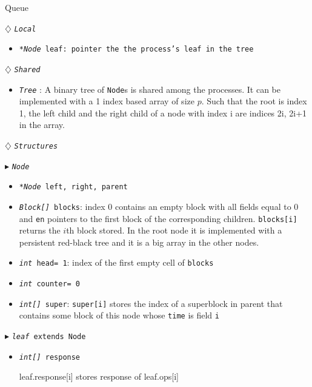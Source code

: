 \documentclass[10pt]{article}
\renewcommand{\tt}[1]{\texttt{#1}}
\renewcommand{\sl}[1]{\textsl{#1}}
\renewcommand{\bf}[1]{\textbf{#1}}
\theoremstyle{definition}
\begin{document}
\begin{algorithm}
\caption{Queue \label{algQ}}
\begin{algorithmic}[1]
\begin{multicols}{2}


\Statex $\diamondsuit$ \tt{\sl{Local}}
\begin{itemize}
\item \tt{\sl{*Node} leaf\textsf{: pointer the the process's leaf in the tree}}
\end{itemize}

\Statex

\Statex $\diamondsuit$ \tt{\sl{Shared}}
\begin{itemize}
\item \tt{\sl{Tree}} \textsf{: A binary tree of \tt{Node}s is shared among the processes. It can be implemented with a 1 index based array of size $p$. Such that the root is index 1, the left child and the right child of a node with index i are indices 2i, 2i+1 in the array.}
\end{itemize}

\Statex
\Statex $\diamondsuit$ \tt{\sl{Structures}}

\Statex $\blacktriangleright$ \tt{\sl{Node}}
\begin{itemize}
\item \tt{\sl{*Node} left, right, parent}
\item \tt{\sl{Block[]} blocks}\textsf{: index 0 contains an empty block with all fields equal to 0 and \tt{en} pointers to the first block of the corresponding children. \tt{blocks[i]} returns the $i$th block stored.  In the root node it is implemented with a persistent red-black tree and it is a big array in the other nodes.}
\item \tt{\sl{int} head= 1}\textsf{: index of the first empty cell of \tt{blocks}}
\item \tt{\sl{int} counter= 0}\textsf{}
\item \tt{\sl{int[]} super}\textsf{: \tt{super[i]} stores the index of a superblock in parent that contains some block of this node whose \tt{time} is field \tt{i}}
\end{itemize}

\Statex $\blacktriangleright$ \tt{\sl{leaf} extends Node}
\begin{itemize}
  \item \tt{\sl{int[]} response}
  
  \textsf{leaf.response[i] stores response of leaf.ops[i]}
  

\end{itemize}
\end{multicols}
\end{algorithmic}
\end{algorithm}
\end{document}
